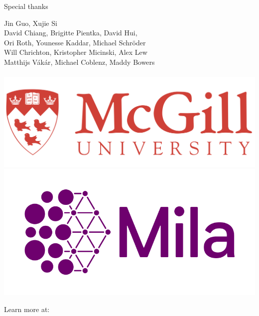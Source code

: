 \documentclass{beamer}
\begin{document}
\begin{frame}{Special thanks}
  \begin{center}
    \LARGE{
      Jin Guo, Xujie Si\\
      David Chiang, Brigitte Pientka, David Hui,\\
      Ori Roth, Younesse Kaddar, Michael Schröder\\
      Will Chrichton, Kristopher Micinski, Alex Lew\\
      Matthijs Vákár, Michael Coblenz, Maddy Bowers\\
      \phantom{}\\
    }
    \href{https://cs.mcgill.ca}{\includegraphics[scale=0.06]{../figures/mcgill_logo.png}}
    \href{https://mila.quebec}{\includegraphics[scale=0.1]{../figures/mila_logo.png}}
  \end{center}
\end{frame}

\begin{frame}
  \begin{center}
    \huge{Learn more at: \\~\\
    \href{https://tidyparse.github.io}{\color{blue}{https://tidyparse.github.io}}}
  \end{center}
\end{frame}
\end{document}
